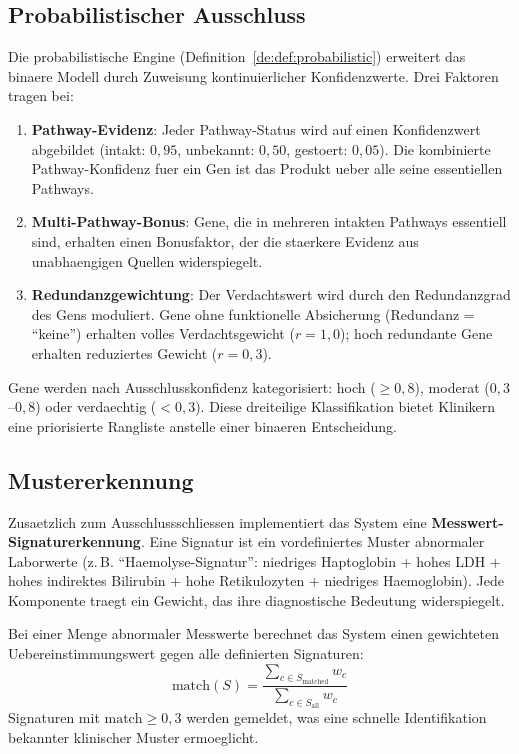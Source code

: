 \documentclass[12pt,a4paper]{article}
\begin{document}
\subsection*{Probabilistischer Ausschluss}

Die probabilistische Engine (Definition~\ref{de:def:probabilistic}) erweitert das binaere Modell durch Zuweisung kontinuierlicher Konfidenzwerte. Drei Faktoren tragen bei:

\begin{enumerate}
    \item \textbf{Pathway-Evidenz}: Jeder Pathway-Status wird auf einen Konfidenzwert abgebildet (intakt: $0{,}95$, unbekannt: $0{,}50$, gestoert: $0{,}05$). Die kombinierte Pathway-Konfidenz fuer ein Gen ist das Produkt ueber alle seine essentiellen Pathways.
    \item \textbf{Multi-Pathway-Bonus}: Gene, die in mehreren intakten Pathways essentiell sind, erhalten einen Bonusfaktor, der die staerkere Evidenz aus unabhaengigen Quellen widerspiegelt.
    \item \textbf{Redundanzgewichtung}: Der Verdachtswert wird durch den Redundanzgrad des Gens moduliert. Gene ohne funktionelle Absicherung (Redundanz = "`keine"') erhalten volles Verdachtsgewicht ($r = 1{,}0$); hoch redundante Gene erhalten reduziertes Gewicht ($r = 0{,}3$).
\end{enumerate}

Gene werden nach Ausschlusskonfidenz kategorisiert: hoch ($\geq 0{,}8$), moderat ($0{,}3$--$0{,}8$) oder verdaechtig ($< 0{,}3$). Diese dreiteilige Klassifikation bietet Klinikern eine priorisierte Rangliste anstelle einer binaeren Entscheidung.

\subsection*{Mustererkennung}

Zusaetzlich zum Ausschlussschliessen implementiert das System eine \textbf{Messwert-Signaturerkennung}. Eine Signatur ist ein vordefiniertes Muster abnormaler Laborwerte (z.\,B. "`Haemolyse-Signatur"': niedriges Haptoglobin + hohes LDH + hohes indirektes Bilirubin + hohe Retikulozyten + niedriges Haemoglobin). Jede Komponente traegt ein Gewicht, das ihre diagnostische Bedeutung widerspiegelt.

Bei einer Menge abnormaler Messwerte berechnet das System einen gewichteten Uebereinstimmungswert gegen alle definierten Signaturen:
\begin{equation}
    \text{match}(S) = \frac{\sum_{c \in S_{\text{matched}}} w_c}{\sum_{c \in S_{\text{all}}} w_c}
\end{equation}
Signaturen mit $\text{match} \geq 0{,}3$ werden gemeldet, was eine schnelle Identifikation bekannter klinischer Muster ermoeglicht.
\end{document}
